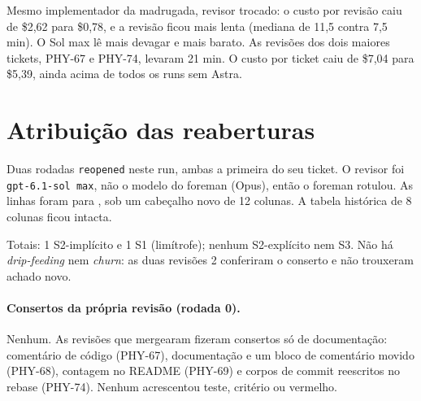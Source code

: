 \documentclass[11pt,a4paper]{article}
\begin{document}
\medskip
Mesmo implementador da madrugada, revisor trocado: o custo por revisão caiu de
\$2,62 para \$0,78, e a revisão ficou mais lenta (mediana de 11,5 contra 7,5
min). O Sol max lê mais devagar e mais barato. As revisões dos dois maiores
tickets, PHY-67 e PHY-74, levaram 21 min. O custo por ticket caiu de \$7,04
para \$5,39, ainda acima de todos os runs sem Astra.

\section{Atribuição das reaberturas}

Duas rodadas \texttt{reopened} neste run, ambas a primeira do seu ticket. O
revisor foi \texttt{gpt-6.1-sol max}, não o modelo do foreman (Opus), então o
foreman rotulou. As linhas foram para ,
sob um cabeçalho novo de 12 colunas. A tabela histórica de 8 colunas ficou
intacta.

\medskip
{}

\medskip
Totais: 1 S2-implícito e 1 S1 (limítrofe); nenhum S2-explícito nem S3. Não há
\emph{drip-feeding} nem \emph{churn}: as duas revisões 2 conferiram o conserto
e não trouxeram achado novo.

\paragraph{Consertos da própria revisão (rodada 0).} Nenhum. As revisões que
mergearam fizeram consertos só de documentação: comentário de código (PHY-67),
documentação e um bloco de comentário movido (PHY-68), contagem no README (PHY-69) e corpos
de commit reescritos no rebase (PHY-74). Nenhum acrescentou teste, critério ou
vermelho.
\end{document}
